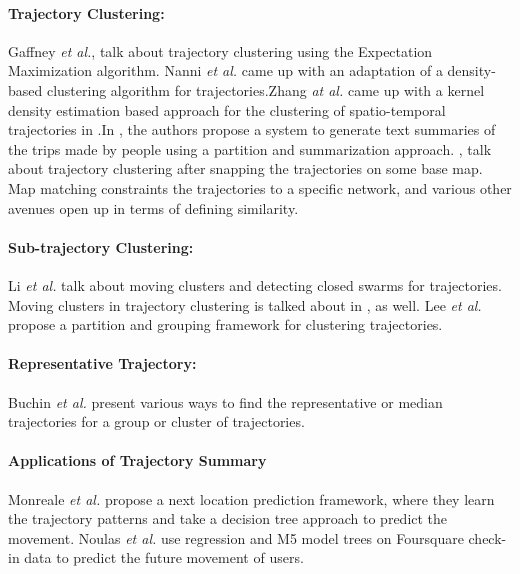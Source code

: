 \paragraph{Trajectory Clustering:}
Gaffney \emph{et al.}\cite{gaffney1999trajectory},  talk about trajectory clustering using the Expectation Maximization algorithm. Nanni \emph{et al.} \cite{nanni2006time} came up with an adaptation of a density-based clustering algorithm for trajectories.Zhang \emph{at al.} came up with a kernel density estimation based approach for the clustering of spatio-temporal trajectories in \cite{Zhang}.In \cite{su2015making}, the authors propose a system to generate text summaries of the trips made by people using a partition and summarization approach. \cite{mapmatch1},\cite{mapmatch2} talk about trajectory clustering after snapping the trajectories on some base map. Map matching constraints the trajectories to a specific network, and various other avenues open up in terms of defining similarity.

\paragraph{Sub-trajectory Clustering:}
Li \emph{et al.}\cite{Li2010} talk about moving clusters and detecting closed swarms for trajectories. Moving clusters in trajectory clustering is talked about in \cite{flock1},\cite{flock2} as well. Lee \emph{et al.} \cite{Lee2007} propose a partition and grouping framework for clustering trajectories.

\paragraph{Representative Trajectory:}
Buchin \emph{et al.}\cite{median1} present various ways to find the representative or median trajectories for a group or cluster of trajectories.

\paragraph{Applications of Trajectory Summary}

Monreale \emph{et al.} \cite{wherenext} propose a next location prediction framework, where they learn the trajectory patterns and take a decision tree approach to predict the movement. Noulas \emph{et al.} \cite{icdmnext} use regression and M5 model trees on Foursquare check-in data to predict the future movement of users.



